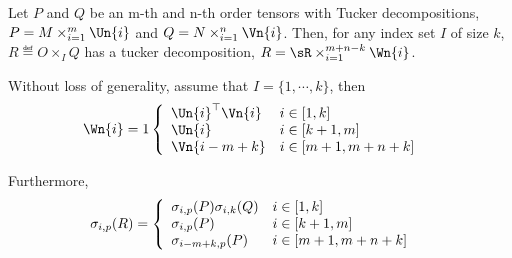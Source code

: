 \begin{property}
  Let $P$ and $Q$ be an m-th and n-th order tensors with Tucker decompositions,
  $P = M \times_{i=1}^m \Un{i}$ and
  $Q = N \times_{i=1}^n \Vn{i}$.
  Then, for any index set $I$ of size $k$, 
  $R \eqdef O \times_{I} Q$ has a tucker decomposition,
  $R = \sR \times_{i=1}^{m+n-k} \Wn{i}$. 
  
  Without loss of generality, assume that $I = \{1, \cdots, k\}$, then 
  \begin{align*}
    \Wn{i} &= 1 \left\{
    \begin{array}{l l}
      {\Un{i}}^\top \Vn{i} & i \in [1, k] \\
      \Un{i}              & i \in [k+1, m] \\
      \Vn{i - m + k}      & i \in [m+1, m+n+k]
    \end{array}
    \right.
  \end{align*}

  Furthermore,
  \begin{align*}
    \sigma_{i,p}(R) &= \left\{
    \begin{array}{l l}
      \sigma_{i,p}(P) \sigma_{i,k}(Q) & i \in [1, k] \\
      \sigma_{i,p}(P) & i \in [k+1, m] \\
      \sigma_{i - m + k,p}(P) & i \in [m+1, m+n+k]
    \end{array}
    \right.
  \end{align*}
\end{property}
